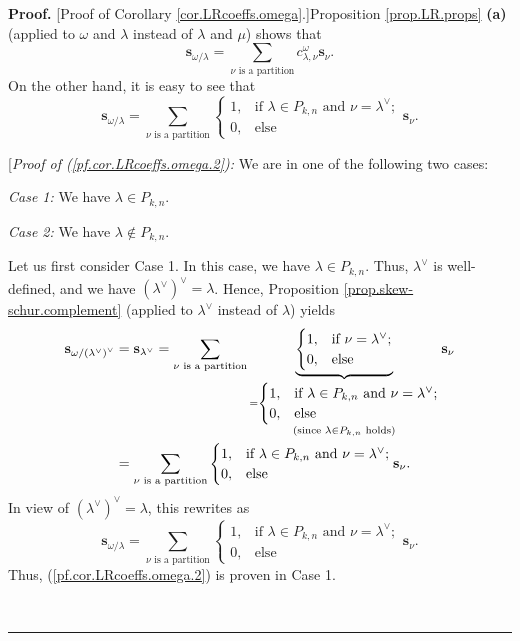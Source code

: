 \documentclass[numbers=enddot,12pt,final,onecolumn,notitlepage]{scrartcl}%
\theoremstyle{definition}
\newenvironment{proof}[1][Proof]{\noindent\textbf{#1.} }{\ \rule{0.5em}{0.5em}}
\let\sumnonlimits\sum
\renewcommand{\sum}{\sumnonlimits\limits}
\begin{document}
\begin{proof}
[Proof of Corollary \ref{cor.LRcoeffs.omega}.]Proposition \ref{prop.LR.props}
\textbf{(a)} (applied to $\omega$ and $\lambda$ instead of $\lambda$ and $\mu
$) shows that
\begin{equation}
\mathbf{s}_{\omega/\lambda}=\sum_{\nu\text{ is a partition}}c_{\lambda,\nu
}^{\omega}\mathbf{s}_{\nu}. \label{pf.cor.LRcoeffs.omega.1}%
\end{equation}
On the other hand, it is easy to see that%
\begin{equation}
\mathbf{s}_{\omega/\lambda}=\sum_{\nu\text{ is a partition}}%
\begin{cases}
1, & \text{if }\lambda\in P_{k,n}\text{ and }\nu=\lambda^{\vee};\\
0, & \text{else}%
\end{cases}
\mathbf{s}_{\nu}. \label{pf.cor.LRcoeffs.omega.2}%
\end{equation}


[\textit{Proof of (\ref{pf.cor.LRcoeffs.omega.2}):} We are in one of the
following two cases:

\textit{Case 1:} We have $\lambda\in P_{k,n}$.

\textit{Case 2:} We have $\lambda\notin P_{k,n}$.

Let us first consider Case 1. In this case, we have $\lambda\in P_{k,n}$.
Thus, $\lambda^{\vee}$ is well-defined, and we have $\left(  \lambda^{\vee
}\right)  ^{\vee}=\lambda$. Hence, Proposition
\ref{prop.skew-schur.complement} (applied to $\lambda^{\vee}$ instead of
$\lambda$) yields
\begin{align*}
\mathbf{s}_{\omega/\left(  \lambda^{\vee}\right)  ^{\vee}}  &  =\mathbf{s}%
_{\lambda^{\vee}}=\sum_{\nu\text{ is a partition}}\underbrace{%
\begin{cases}
1, & \text{if }\nu=\lambda^{\vee};\\
0, & \text{else}%
\end{cases}
}_{\substack{=%
\begin{cases}
1, & \text{if }\lambda\in P_{k,n}\text{ and }\nu=\lambda^{\vee};\\
0, & \text{else}%
\end{cases}
\\\text{(since }\lambda\in P_{k,n}\text{ holds)}}}\mathbf{s}_{\nu}\\
&  =\sum_{\nu\text{ is a partition}}%
\begin{cases}
1, & \text{if }\lambda\in P_{k,n}\text{ and }\nu=\lambda^{\vee};\\
0, & \text{else}%
\end{cases}
\mathbf{s}_{\nu}.
\end{align*}
In view of $\left(  \lambda^{\vee}\right)  ^{\vee}=\lambda$, this rewrites as
\[
\mathbf{s}_{\omega/\lambda}=\sum_{\nu\text{ is a partition}}%
\begin{cases}
1, & \text{if }\lambda\in P_{k,n}\text{ and }\nu=\lambda^{\vee};\\
0, & \text{else}%
\end{cases}
\mathbf{s}_{\nu}.
\]
Thus, (\ref{pf.cor.LRcoeffs.omega.2}) is proven in Case 1.


\end{proof}
\end{document}
